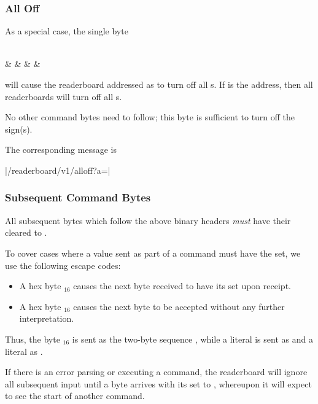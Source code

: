 \subsubsection{All Off}
As a special case, the single byte
\begin{center}
	\begin{bytefield}[endianness=big]{8}
		 \\
		&
		&
		&
		&
	\end{bytefield}
\end{center}
will cause the readerboard addressed as  to turn off all \led s.
If  is the  address, then all readerboards will turn off
all \led s.

No other command bytes need to follow; this byte is sufficient to turn off
the sign(s).

The corresponding  message is
\begin{Coding}
	|/readerboard/v1/alloff?a=|
\end{Coding}

\subsubsection{Subsequent Command Bytes}
All subsequent bytes which follow the above binary headers \emph{must} have their
 cleared to . 

To cover cases where a value sent as part of a command must have the 
set, we use the following escape codes:
\begin{itemize}
	\item A hex byte $_{16}$ causes the next byte received to have its
		 set upon receipt.
	\item A hex byte $_{16}$ causes the next byte to be accepted without
		any further interpretation.
\end{itemize}
Thus, the byte $_{16}$ is sent as the two-byte sequence ,
while a literal  is sent as  and a literal  as .

If there is an error parsing or executing a command, the readerboard will ignore
all subsequent input until a byte arrives with its  set to ,
whereupon it will expect to see the start of another command. 


